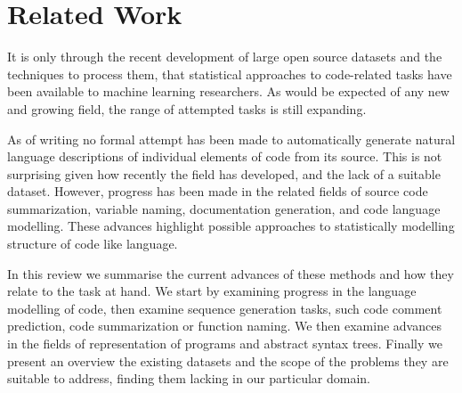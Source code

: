 \section{Related Work}

It is only through the recent development of large open source datasets and the techniques to process them, that statistical approaches to code-related tasks have been available to machine learning researchers. 
As would be expected of any new and growing field, the range of attempted tasks is still expanding. 


As of writing no formal attempt has been made to automatically generate natural language descriptions of individual elements of code from its source.  
This is not surprising given how recently the field has developed, and the lack of a suitable dataset.
However, progress has been made in the related fields of source code summarization, variable naming, documentation generation, and code language modelling. 
These advances highlight possible approaches to statistically modelling structure of code like language.  

In this review we summarise the current advances of these methods and how they relate to the task at hand.  We start by examining progress in the language modelling of code, then examine sequence generation tasks, such code comment prediction, code summarization or function naming. We then examine advances in the fields of representation of programs and abstract syntax trees. Finally we present an overview the existing datasets and the scope of the problems they are suitable to address, finding them lacking in our particular domain.




